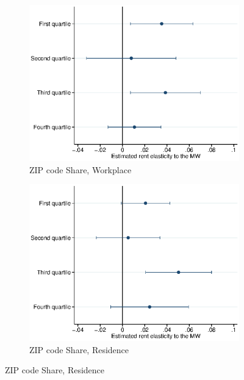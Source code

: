 \begin{figure}[htb!]
\begin{subfigure}[b]{.5\textwidth}
	\end{subfigure}\\
	\begin{subfigure}[b]{.5\textwidth}
		\caption{ZIP code Share, Workplace}
		\includegraphics[width = \textwidth]
		{../../analysis/first_differences_expmw/output/fd_static_heter_walall_29y_lowinc_zsh_st_qtl.eps}
	\end{subfigure}%
	\begin{subfigure}[b]{.5\textwidth}
		\caption{ZIP code Share, Residence}
		\includegraphics[width = \textwidth]
		{../../analysis/first_differences_expmw/output/fd_static_heter_halall_29y_lowinc_zsh_st_qtl.eps}
	\end{subfigure}
	\begin{minipage}{0.95\textwidth}\footnotesize

\end{minipage}
\end{figure}
